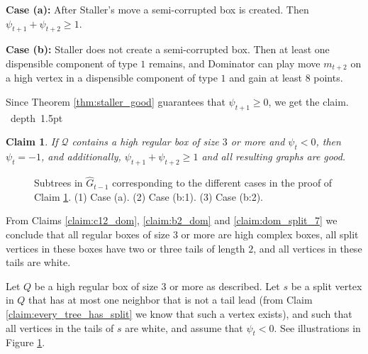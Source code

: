 \documentclass[11pt]{article}
\def\Proof{\par\noindent{\bf Proof:~}}
\def\blackslug{\hbox{\hskip 1pt \vrule width 4pt height 8pt
    depth 1.5pt \hskip 1pt}}
\def\QED{\quad\blackslug\lower 8.5pt\null\par}
\newtheorem{claim}[theorem]{Claim}
\theoremstyle{definition}
\begin{document}
\smallskip
\par\noindent
{\bf Case (a):}
After Staller's move a semi-corrupted box is created.
Then $\psi_{t+1} + \psi_{t+2} \geq 1$.

\smallskip
\par\noindent
{\bf Case (b):}
Staller does not create a semi-corrupted box.
Then at least one dispensible component of type $1$ remains, 
and Dominator can play move $m_{t+2}$ on a high vertex in a dispensible component of type $1$ and gain at least $8$ points.

\smallskip
\par\noindent
Since Theorem \ref{thm:staller_good} guarantees that $\psi_{t+1} \geq 0$, we get the claim.
\QED

\begin{claim}
\label{claim:minus_dom}
If $\mathcal{Q}$ contains a high regular box of size $3$ or more and $\psi_t < 0$, then $\psi_t = -1$, and additionally, $\psi_{t+1} + \psi_{t+2} \geq 1$ and all resulting graphs are good.
\end{claim}
\begin{figure}[thbp]
  \caption{\sf Subtrees in $\hat{G}_{t-1}$ corresponding to the different cases in the proof of Claim \ref{claim:minus_dom}.
		(1) Case (a). 
		(2) Case (b:1). 
		(3) Case (b:2).} 
  \medskip
  \centering
  \label{fig:dom_6}
\end{figure}
\Proof
From Claims \ref{claim:c12_dom}, \ref{claim:b2_dom} and \ref{claim:dom_split_7} we conclude that all regular boxes of size $3$ or more are high complex boxes, all split vertices in these boxes have two or three tails of length $2$, and all vertices in these tails are white.

Let $Q$ be a high regular box of size $3$ or more as described.
Let $s$ be a split vertex in $Q$ that has at most one neighbor that is not a tail lead (from Claim \ref{claim:every_tree_has_split} we know that such a vertex exists), and such that all vertices in the tails of $s$ are white, and assume that $\psi_t < 0$.
See illustrations in Figure \ref{fig:dom_6}.
\end{document}
